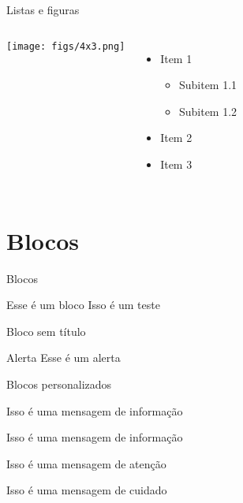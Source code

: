 \documentclass{beamer}
\begin{document}
\begin{frame}{Listas e figuras}
\begin{columns}
     \begin{center}
        \texttt{[image: figs/4x3.png]}
     \end{center}
    \begin{itemize}
        \item Item 1
        \begin{itemize}
            \item Subitem 1.1
            \item Subitem 1.2
        \end{itemize}
        \item Item 2
        \item Item 3
    \end{itemize}
\end{columns} 
\end{frame}


\section{Blocos}


\begin{frame}{Blocos}
    \begin{block}{Esse é um bloco}
        Isso é um teste
    \end{block}
    \begin{block}{}
    Bloco sem título	
    \end{block}
    \begin{alertblock}{Alerta}
        Esse é um alerta
    \end{alertblock}
\end{frame}


\begin{frame}{Blocos personalizados}

    \begin{informacao}
    Isso é uma mensagem de informação
    \end{informacao}
    
    \begin{informacaoazul}
        Isso é uma mensagem de informação
    \end{informacaoazul}

    \begin{atencao}
        Isso é uma mensagem de atenção
    \end{atencao}
    
    \begin{cuidado}
        Isso é uma mensagem de cuidado
    \end{cuidado}
\end{frame}
\end{document}
